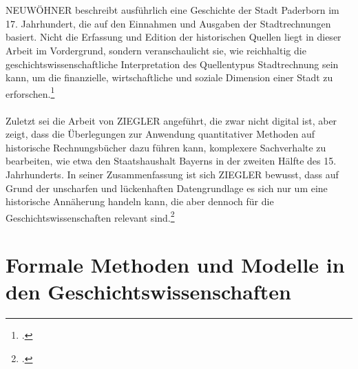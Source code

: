 \documentclass[12pt,a4paper]{article}
\begin{document}
\\
\\
NEUWÖHNER beschreibt ausführlich eine Geschichte der Stadt Paderborn im 17. Jahrhundert, die auf den Einnahmen und Ausgaben der Stadtrechnungen basiert. Nicht die Erfassung und Edition der historischen Quellen liegt in dieser Arbeit im Vordergrund, sondern veranschaulicht sie, wie reichhaltig die geschichtswissenschaftliche Interpretation des Quellentypus Stadtrechnung sein kann, um die finanzielle, wirtschaftliche und soziale Dimension einer Stadt zu erforschen.\footcite[][S.11-50]{neuwohner2016rechnen}  
\\
\\
Zuletzt sei die Arbeit von ZIEGLER angeführt, die zwar nicht digital ist, aber zeigt, dass die Überlegungen zur Anwendung quantitativer Methoden auf historische Rechnungsbücher dazu führen kann, komplexere Sachverhalte zu bearbeiten, wie etwa den Staatshaushalt Bayerns in der zweiten Hälfte des 15. Jahrhunderts. In seiner Zusammenfassung ist sich ZIEGLER bewusst, dass auf Grund der unscharfen und lückenhaften Datengrundlage es sich nur um eine historische Annäherung handeln kann, die aber dennoch für die Geschichtswissenschaften relevant sind.\footcite[][S.221-230]{ziegler1981Staatshaushalt}

\newpage
\section{Formale Methoden und Modelle in den Geschichtswissenschaften}
\end{document}
